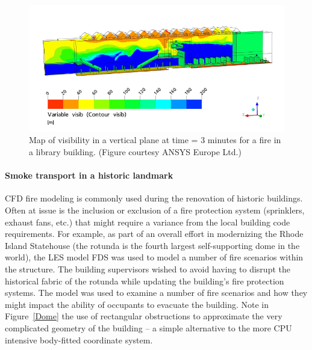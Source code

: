 \documentclass[graybox]{svmult}
\begin{document}
\begin{figure}[ht]
\includegraphics[width=\textwidth]{Fig_library}
\caption{Map of visibility in a vertical plane at time = 3 minutes for a fire in a library building. (Figure courtesy ANSYS Europe Ltd.)}
\label{ANSYS}
\end{figure}

\paragraph{Smoke transport in a historic landmark}

CFD fire modeling is commonly used during the renovation of historic buildings. Often at issue is the inclusion or exclusion of a fire protection system (sprinklers, exhaust fans, etc.) that might require a variance from the local building code requirements. For example, as part of an overall effort in modernizing the Rhode Island Statehouse (the rotunda is the fourth largest self-supporting dome in the world), the LES model FDS was used to model a number of fire scenarios within the structure. The building supervisors wished to avoid having to disrupt the historical fabric of the rotunda while updating the building's fire protection systems. The model was used to examine a number of fire scenarios and how they might impact the ability of occupants to evacuate the building. Note in Figure~\ref{Dome} the use of rectangular obstructions to approximate the very complicated geometry of the building -- a simple alternative to the more CPU intensive body-fitted coordinate system.
\end{document}

